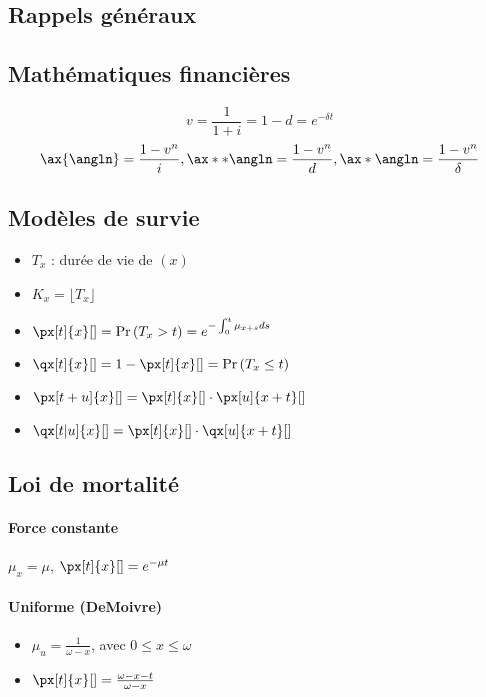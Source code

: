 \documentclass[10pt, french]{article}
\begin{document}
\begin{multicols*}{3} %
\section{Rappels généraux}
\subsection*{Mathématiques financières}
\[v = \frac{1}{1+i} = 1 - d = e^{-\delta t}\]
\[ \ax{\angln} = \frac{1 - v^n}{i}, \ax**{\angln} = \frac{1 - v^n}{d}, \ax*{\angln} = \frac{1 - v^n}{\delta}  \]

\subsection*{Modèles de survie}
\begin{itemize}
\item $T_x$ : durée de vie de $(x)$
\item $K_x =  \lfloor T_x \rfloor$
\item $\px[t]{x}[] = \prob{T_x > t} = e^{- \int_{0}^{t} \mu_{x+s} ds}$
\item $\qx[t]{x}[] = 1 - \px[t]{x}[] = \prob{T_x \leq t}$
\item $\px[t + u]{x}[] = \px[t]{x}[] \cdot \px[u]{x+t}[]$
\item $\qx[t|u]{x}[] = \px[t]{x}[] \cdot \qx[u]{x+t}[]$
\end{itemize}

\subsection*{Loi de mortalité}
\paragraph{Force constante}
$\mu_x = \mu$, $\px[t]{x}[] = e^{-\mu t}$

\paragraph{Uniforme (DeMoivre)}
\begin{itemize}
\item  $\mu_u = \frac{1}{\omega - x}$, avec $0 \leq x \leq \omega$
\item $\px[t]{x}[] = \frac{\omega - x - t}{\omega - x}$
\end{itemize}



\end{multicols*}
\end{document}

